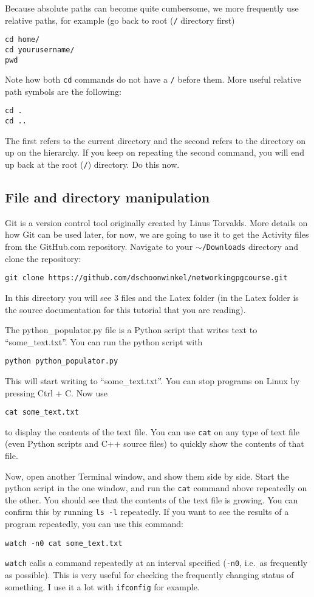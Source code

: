 \documentclass[a4paper]{article}
\begin{document}
Because absolute paths can become quite cumbersome, we more frequently use relative paths, for example (go back to root (\texttt{/} directory first)
\begin{lstlisting}
cd home/
cd yourusername/
pwd
\end{lstlisting}
Note how both \texttt{cd} commands do not have a \texttt{/} before them.
More useful relative path symbols are the following:
\begin{lstlisting}
cd .
cd ..
\end{lstlisting}
The first refers to the current directory and the second refers to the directory on up on the hierarchy. If you keep on repeating the second command, you will end up back at the root (\texttt{/}) directory. Do this now.

\subsection{File and directory manipulation}
Git is a version control tool originally created by Linus Torvalds. More details on how Git can be used later, for now, we are going to use it to get the Activity files from the GitHub.com repository. Navigate to your \texttt{$\sim$/Downloads} directory and clone the repository: 
\begin{lstlisting}
git clone https://github.com/dschoonwinkel/networkingpgcourse.git
\end{lstlisting}

In this directory you will see 3 files and the Latex folder (in the Latex folder is the source documentation for this tutorial that you are reading). 


The python\_populator.py file is a Python script that writes text to ``some\_text.txt''. You can run the python script with 
\begin{lstlisting}
python python_populator.py
\end{lstlisting}
This will start writing to ``some\_text.txt''. You can stop programs on Linux by pressing Ctrl + C. Now use 
\begin{lstlisting}
cat some_text.txt
\end{lstlisting} 
to display the contents of the text file. You can use \texttt{cat} on any type of text file (even Python scripts and C++ source files) to quickly show the contents of that file. 

Now, open another Terminal window, and show them side by side. Start the python script in the one window, and run the \texttt{cat} command above repeatedly on the other. You should see that the contents of the text file is growing. You can confirm this by running \texttt{ls -l} repeatedly. 
If you want to see the results of a program repeatedly, you can use this command: 
\begin{lstlisting}
watch -n0 cat some_text.txt
\end{lstlisting} 
\texttt{watch} calls a command repeatedly at an interval specified (\texttt {-n0}, i.e.\ as frequently as possible). This is very useful for checking the frequently changing status of something. I use it a lot with \texttt{ifconfig} for example. 
\end{document}

